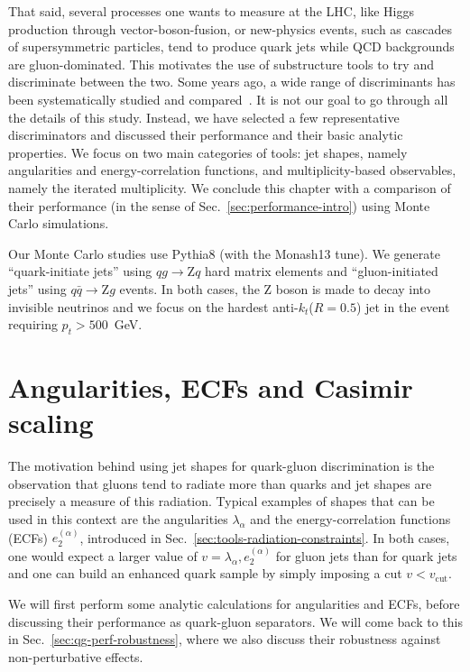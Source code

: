 That said, several processes one wants to measure at the LHC, like
Higgs production through vector-boson-fusion, or new-physics events, such as cascades of supersymmetric particles, tend to
produce quark jets while QCD backgrounds are gluon-dominated. This
motivates the use of substructure tools to try and discriminate between
the two.
%
Some years ago, a wide range of discriminants
has been systematically studied and
compared~\cite{Gallicchio:2012ez}.
%
It is not our goal to go through all the details of this
study. Instead, we have selected a few representative discriminators
and discussed their performance and their basic analytic properties.
%
We focus on two main categories of tools: jet shapes, namely
angularities and energy-correlation functions, and multiplicity-based
observables, namely the iterated \SD multiplicity.
%
We conclude this chapter with a comparison of their performance (in
the sense of Sec.~\ref{sec:performance-intro}) using Monte Carlo
simulations.

Our Monte Carlo studies use Pythia8 (with the Monash13 tune). We
generate ``quark-initiate jets'' using $qg\to \text{Z}q$ hard matrix
elements and ``gluon-initiated jets'' using $q\bar q\to \text{Z}g$
events. In both cases, the Z boson is made to decay into invisible
neutrinos and we focus on the hardest anti-$k_t$($R=0.5$) jet in the
event requiring $p_t>500$~GeV.

\section{Angularities, ECFs and Casimir scaling}

The motivation behind using jet shapes for quark-gluon discrimination
is the observation that gluons tend to radiate more than quarks and jet shapes are
precisely a measure of this radiation.
%
Typical examples of shapes that can be used in this context are the
angularities $\lambda_\alpha$ and the energy-correlation functions (ECFs)
$e_2^{(\alpha)}$, introduced in
Sec.~\ref{sec:tools-radiation-constraints}.
%
In both cases, one would expect a larger value of
$v=\lambda_\alpha,e_2^{(\alpha)}$ for gluon jets than for quark jets
and one can build an enhanced quark sample by simply imposing a cut
$v<v_\text{cut}$.

We will first perform some analytic calculations for angularities and ECFs,
before discussing their performance as quark-gluon separators. We will
come back to this in Sec.~\ref{sec:qg-perf-robustness}, where we
also discuss their robustness against non-perturbative effects.

